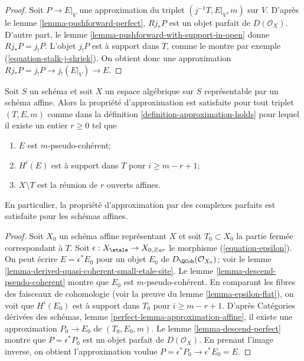 \begin{proof}
Soit $P \to E|_V$ une approximation du triplet $(j^{-1}T,E|_V,m)$ sur $V$.
D'apr\`es le lemme \ref{lemma-pushforward-perfect}, $Rj_*P$ est un objet
parfait de $D(\mathcal{O}_X)$. D'autre part, le lemme
\ref{lemma-pushforward-with-support-in-open} donne $Rj_*P=j_!P$.
L'objet $j_!P$ est \`a support dans $T$, comme le montre par exemple
(\ref{equation-stalk-j-shriek}). On obtient donc une approximation
$Rj_*P=j_!P \to j_!(E|_V) \to E$.
\end{proof}

\begin{lemma}
\label{lemma-approximation-affine}
Soit $S$ un sch\'ema et soit $X$ un espace alg\'ebrique sur $S$ repr\'esentable
par un sch\'ema affine. Alors la propri\'et\'e d'approximation est satisfaite
pour tout triplet $(T,E,m)$ comme dans la d\'efinition
\ref{definition-approximation-holds} pour lequel il existe un entier
$r\geq0$ tel que
\begin{enumerate}
\item $E$ est $m$-pseudo-coh\'erent;
\item $H^i(E)$ est \`a support dans $T$ pour $i\geq m-r+1$;
\item $X\setminus T$ est la r\'eunion de $r$ ouverts affines.
\end{enumerate}
En particulier, la propri\'et\'e d'approximation par des complexes parfaits est
satisfaite pour les sch\'emas affines.
\end{lemma}

\begin{proof}
Soit $X_0$ un sch\'ema affine repr\'esentant $X$ et soit $T_0\subset X_0$ la
partie ferm\'ee correspondant \`a $T$. Soit
$\epsilon : X_\etale \to X_{0,Zar}$ le morphisme
(\ref{equation-epsilon}). On peut \'ecrire $E=\epsilon^*E_0$ pour un objet
$E_0$ de $D_\QCoh(\mathcal{O}_{X_0})$; voir le lemme
\ref{lemma-derived-quasi-coherent-small-etale-site}.
Le lemme \ref{lemma-descend-pseudo-coherent} montre que $E_0$ est
$m$-pseudo-coh\'erent. En comparant les fibres des faisceaux de cohomologie
(voir la preuve du lemme \ref{lemma-epsilon-flat}), on voit que $H^i(E_0)$ est
\`a support dans $T_0$ pour $i\geq m-r+1$. D'apr\`es Cat\'egories d\'eriv\'ees
des sch\'emas, lemme \ref{perfect-lemma-approximation-affine}, il existe une
approximation $P_0\to E_0$ de $(T_0,E_0,m)$. Le lemme
\ref{lemma-descend-perfect} montre que $P=\epsilon^*P_0$ est un objet parfait
de $D(\mathcal{O}_X)$. En prenant l'image inverse, on obtient l'approximation
voulue $P=\epsilon^*P_0\to\epsilon^*E_0=E$.
\end{proof}

